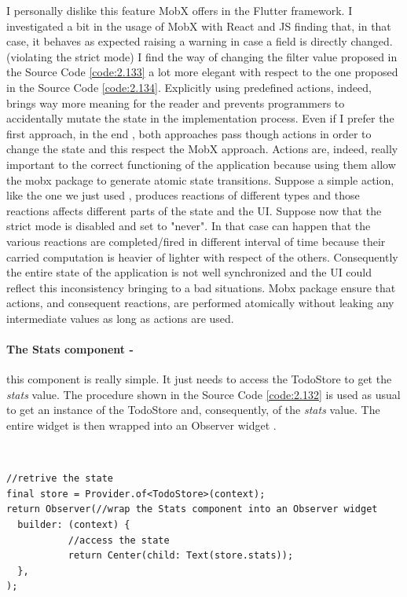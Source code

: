I personally dislike this feature MobX offers in the Flutter framework. I investigated a bit in the usage of MobX with React and JS finding that, in that case, it behaves as expected raising a warning in case a field is directly changed. (violating the strict mode) I find the way of changing the filter value proposed in the Source Code \ref{code:2.133} a lot more elegant with respect to the one proposed in the Source Code \ref{code:2.134}. Explicitly using predefined actions, indeed, brings way more meaning for the reader and prevents programmers to accidentally mutate the state in the implementation process. Even if I prefer the first approach, in the end , both approaches pass though actions in order to change the state and this respect the MobX approach. Actions are, indeed, really important to the correct functioning of the application because using them allow the mobx package to generate atomic state transitions. Suppose a simple action, like the one we just used , produces reactions of different types and those reactions affects different parts of the state and the UI. Suppose now that the strict mode is disabled and set to "never". In that case can happen that the various reactions are completed/fired in different interval of time because their carried computation is heavier of lighter with respect of the others. Consequently the entire state of the application is not well synchronized and the UI could reflect this inconsistency bringing to a bad situations. Mobx package ensure that actions, and consequent reactions, are performed atomically without leaking any intermediate values as long as actions are used.
\paragraph{The Stats component - }
\label{subpar:todo_app_bloc_core_state} this component is really simple. It just needs to access the TodoStore to get the \textit{stats} value. The procedure shown in the Source Code \ref{code:2.132} is used as usual to get an instance of the TodoStore and, consequently, of the \textit{stats} value. The entire widget is then wrapped into an Observer widget .
\begin{code}
\mbox{}\\
 \mbox{}
		\label{code:2.14}
\begin{verbatim}
//retrive the state
final store = Provider.of<TodoStore>(context);
return Observer(//wrap the Stats component into an Observer widget
  builder: (context) {
           //access the state
           return Center(child: Text(store.stats));
  },
);
\end{verbatim}
\mbox{}
\end{code}
